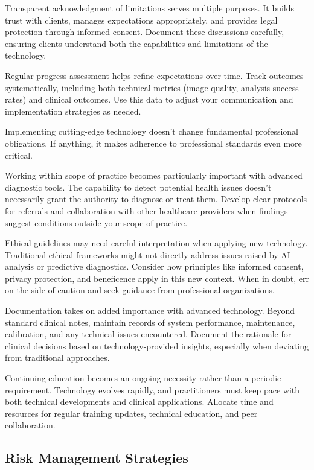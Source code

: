 \documentclass[
  Letterpaper,
]{scrbook}
\begin{document}
Transparent acknowledgment of limitations serves multiple purposes. It
builds trust with clients, manages expectations appropriately, and
provides legal protection through informed consent. Document these
discussions carefully, ensuring clients understand both the capabilities
and limitations of the technology.

Regular progress assessment helps refine expectations over time. Track
outcomes systematically, including both technical metrics (image
quality, analysis success rates) and clinical outcomes. Use this data to
adjust your communication and implementation strategies as needed.

Implementing cutting-edge technology doesn't change fundamental
professional obligations. If anything, it makes adherence to
professional standards even more critical.

Working within scope of practice becomes particularly important with
advanced diagnostic tools. The capability to detect potential health
issues doesn't necessarily grant the authority to diagnose or treat
them. Develop clear protocols for referrals and collaboration with other
healthcare providers when findings suggest conditions outside your scope
of practice.

Ethical guidelines may need careful interpretation when applying new
technology. Traditional ethical frameworks might not directly address
issues raised by AI analysis or predictive diagnostics. Consider how
principles like informed consent, privacy protection, and beneficence
apply in this new context. When in doubt, err on the side of caution and
seek guidance from professional organizations.

Documentation takes on added importance with advanced technology. Beyond
standard clinical notes, maintain records of system performance,
maintenance, calibration, and any technical issues encountered. Document
the rationale for clinical decisions based on technology-provided
insights, especially when deviating from traditional approaches.

Continuing education becomes an ongoing necessity rather than a periodic
requirement. Technology evolves rapidly, and practitioners must keep
pace with both technical developments and clinical applications.
Allocate time and resources for regular training updates, technical
education, and peer collaboration.

\subsection{Risk Management
Strategies}\label{risk-management-strategies}
\end{document}

